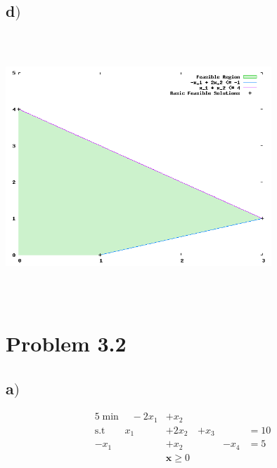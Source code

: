 \documentclass[a4paper,12pt]{article}
\begin{document}
\subsection*{d\()\)}
\begin{center}
  \includegraphics[width=10cm, height=10cm, keepaspectratio=true]{31.png}
\end{center}
\section*{Problem 3.2}
\subsection*{a\()\)}
\begin{alignat*}{5}
  \min \quad -2x_1& + x_2 \\
  \text{s.t} \quad \quad x_1& + 2x_2& + x_3& {}& = 10 \\
  -x_1& + x_2& {}& - x_4& = 5 \\
  {}& \mathbf{x} \ge 0
\end{alignat*}
\end{document}
